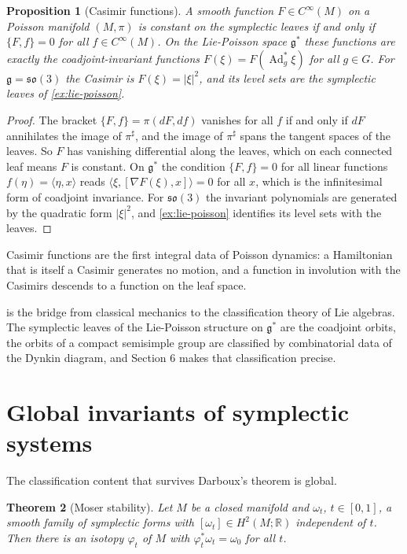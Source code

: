 \documentclass[11pt,letterpaper]{article}
\newtheorem{theorem}{Theorem}[section]
\newtheorem{proposition}[theorem]{Proposition}
\theoremstyle{definition}
\theoremstyle{remark}
\begin{document}
\begin{proposition}[Casimir functions]
\label{prop:casimirs}
A smooth function $F \in C^{\infty}(M)$ on a Poisson manifold $(M, \pi)$ is constant on the symplectic leaves if and only if $\{F, f\} = 0$ for all $f \in C^{\infty}(M)$. On the Lie-Poisson space $\mathfrak{g}^{*}$ these functions are exactly the coadjoint-invariant functions $F(\xi) = F(\operatorname{Ad}^{*}_{g} \xi)$ for all $g \in G$. For $\mathfrak{g} = \mathfrak{so}(3)$ the Casimir is $F(\xi) = |\xi|^{2}$, and its level sets are the symplectic leaves of \cref{ex:lie-poisson}.
\end{proposition}

\begin{proof}
The bracket $\{F, f\} = \pi(dF, df)$ vanishes for all $f$ if and only if $dF$ annihilates the image of $\pi^{\sharp}$, and the image of $\pi^{\sharp}$ spans the tangent spaces of the leaves. So $F$ has vanishing differential along the leaves, which on each connected leaf means $F$ is constant. On $\mathfrak{g}^{*}$ the condition $\{F, f\} = 0$ for all linear functions $f(\eta) = \langle \eta, x \rangle$ reads $\langle \xi, [\nabla F(\xi), x] \rangle = 0$ for all $x$, which is the infinitesimal form of coadjoint invariance. For $\mathfrak{so}(3)$ the invariant polynomials are generated by the quadratic form $|\xi|^{2}$, and \cref{ex:lie-poisson} identifies its level sets with the leaves.
\end{proof}

Casimir functions are the first integral data of Poisson dynamics: a Hamiltonian that is itself a Casimir generates no motion, and a function in involution with the Casimirs descends to a function on the leaf space.

 is the bridge from classical mechanics to the classification theory of Lie algebras. The symplectic leaves of the Lie-Poisson structure on $\mathfrak{g}^{*}$ are the coadjoint orbits, the orbits of a compact semisimple group are classified by combinatorial data of the Dynkin diagram, and Section 6 makes that classification precise.

\section{Global invariants of symplectic systems}

The classification content that survives Darboux's theorem is global.

\begin{theorem}[Moser stability]
\label{thm:moser-stability}
Let $M$ be a closed manifold and $\omega_t$, $t \in [0, 1]$, a smooth family of symplectic forms with $[\omega_t] \in H^{2}(M; \mathbb{R})$ independent of $t$. Then there is an isotopy $\varphi_t$ of $M$ with $\varphi_t^{*} \omega_t = \omega_0$ for all $t$.
\end{theorem}
\end{document}
